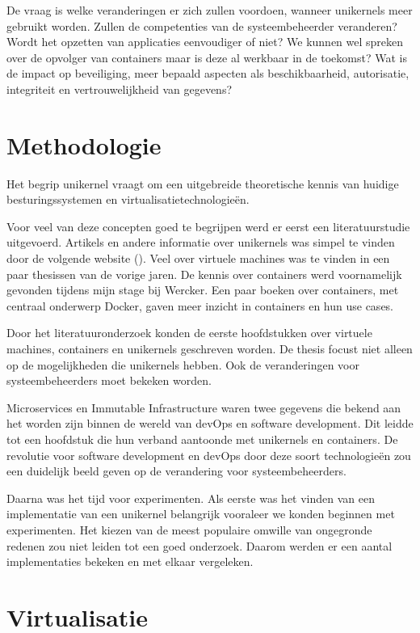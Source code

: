 \documentclass[pdftex,a4paper,12pt,twoside]{report}
\begin{document}
De vraag is welke veranderingen er zich zullen voordoen, wanneer unikernels meer gebruikt worden. Zullen de competenties van de systeembeheerder veranderen? Wordt het opzetten van applicaties eenvoudiger of niet? We kunnen wel spreken over de opvolger van containers maar is deze al werkbaar in de toekomst? Wat is de impact op beveiliging, meer bepaald aspecten als beschikbaarheid, autorisatie, integriteit en vertrouwelijkheid van gegevens?

\chapter{Methodologie}
\label{ch:methodologie}

Het begrip unikernel vraagt om een uitgebreide theoretische kennis van huidige besturingssystemen en virtualisatietechnologieën.

Voor veel van deze concepten goed te begrijpen werd er eerst een literatuurstudie uitgevoerd.
Artikels en andere informatie over unikernels was simpel te vinden door de volgende website (\cite{Unikern}). Veel over virtuele machines was te vinden in een paar thesissen van de vorige jaren. De kennis over containers werd voornamelijk gevonden tijdens mijn stage bij Wercker. Een paar boeken over containers, met centraal onderwerp Docker, gaven meer inzicht in containers en hun use cases.

Door het literatuuronderzoek konden de eerste hoofdstukken over virtuele machines, containers en unikernels geschreven worden. De thesis focust niet alleen op de mogelijkheden die unikernels hebben. Ook de veranderingen voor systeembeheerders moet bekeken worden.

Microservices en Immutable Infrastructure waren twee gegevens die bekend aan het worden zijn binnen de wereld van devOps en software development. Dit leidde tot een hoofdstuk die hun verband aantoonde met unikernels en containers. De revolutie voor software development en devOps door deze soort technologieën zou een duidelijk beeld geven op de verandering voor systeembeheerders.

Daarna was het tijd voor experimenten. Als eerste was het vinden van een implementatie van een unikernel belangrijk vooraleer we konden beginnen met experimenten.
Het kiezen van de meest populaire omwille van ongegronde redenen zou niet leiden tot een goed onderzoek. Daarom werden er een aantal implementaties bekeken en met elkaar vergeleken.

\chapter{Virtualisatie}
\label{ch:virtualisatie}
\end{document}
